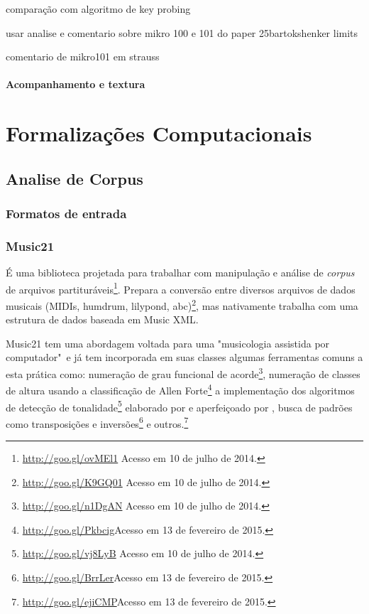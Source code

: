 \documentclass[
	12pt,				%
	openright,			%
	twoside,			%
	a4paper,			%
	english,			%
	french,				%
	spanish,			%
	brazil				%
	]{abntex2}
\begin{document}
comparação com algoritmo de key probing
\cite{cooper1998unfolding}


usar analise e comentario sobre mikro 100 e 101 do paper 25bartokshenker limits
\cite[ p.179]{brown1997iv}

comentario de  mikro101 em strauss
\cite[ p.113]{straus2004}

\subsection{Acompanhamento e textura}


\cite{starr1985melody}






%
%
%

\part{Formalizações Computacionais}


\chapter{Analise de Corpus}
\label{analise_computacional}


\section{Formatos de entrada}

\section{Music21}

É uma biblioteca projetada para trabalhar com manipulação e análise de \textit{corpus} de arquivos partituráveis\footnote{\url{http://goo.gl/ovMEl1} Acesso em 10 de julho de 2014.}. Prepara a conversão entre diversos arquivos de dados musicais (MIDIs, humdrum, lilypond, abc)\footnote{\url{http://goo.gl/K9GQ01} Acesso em 10 de julho de 2014.}, mas nativamente trabalha com uma estrutura de dados baseada em Music XML.

Music21 tem uma abordagem voltada para uma "musicologia assistida por computador"\ e já tem incorporada em suas classes algumas ferramentas comuns a esta prática como: numeração de grau funcional de acorde\footnote{\url{http://goo.gl/n1DgAN} Acesso em 10 de julho de 2014.}, numeração de classes de altura usando a classificação de Allen Forte\footnote{\url{http://goo.gl/Pkbcig}Acesso em 13 de fevereiro de 2015.} a implementação dos algoritmos de detecção de tonalidade\footnote{\url{http://goo.gl/vj8LyB} Acesso em 10 de julho de 2014.} elaborado por  e aperfeiçoado por , busca de padrões como transposições e inversões\footnote{\url{http://goo.gl/BrrLer}Acesso em 13 de fevereiro de 2015.} e outros.\footnote{{\url{http://goo.gl/ejiCMP}Acesso em 13 de fevereiro de 2015.}}
\end{document}
